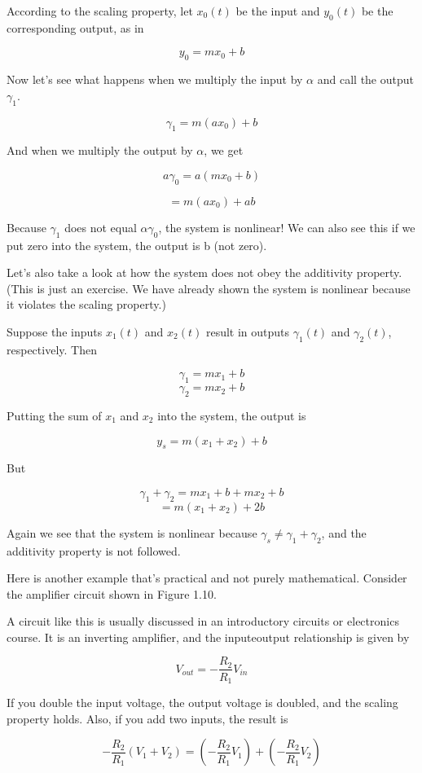 \documentclass[12pt]{article}
\begin{document}
According to the scaling property, let $x_0(t)$ be the input and $y_0(t)$ be the
corresponding output, as in

\[
y_0 = m x_0 + b
\]

Now let’s see what happens when we multiply the input by $\alpha$ and call
the output $\gamma_1$.

\[
\gamma_1 = m (a x_0) + b
\]

And when we multiply the output by $\alpha$, we get

\[
a \gamma_0 = a (m x_0 + b)
\]

\[
=m (a x_0) + ab
\]

Because $\gamma_1$ does not equal $\alpha \gamma_0$, the system is nonlinear! We can also see
this if we put zero into the system, the output is b (not zero).

Let’s also take a look at how the system does not obey the additivity
property. (This is just an exercise. We have already shown the system is
nonlinear because it violates the scaling property.)

Suppose the inputs $x_1(t)$ and $x_2(t)$ result in outputs $\gamma_1(t)$ and $\gamma_2(t)$,
respectively. Then

\[
\gamma_1 = mx_1 + b 
\]
\[
\gamma_2 = mx_2 + b 
\]

Putting the sum of $x_1$ and $x_2$ into the system, the output is

\[
y_s = m(x_1 + x_2) + b 
\]

But

\[
\gamma_1 + \gamma_2 = mx_1 + b + mx_2 + b
\]
\[
= m(x_1 + x_2) + 2b
\]

Again we see that the system is nonlinear because $\gamma_s \neq \gamma_1 + \gamma_2$, and the
additivity property is not followed.

Here is another example that’s practical and not purely mathematical.
Consider the amplifier circuit shown in Figure 1.10.

A circuit like this is usually discussed in an introductory circuits or
electronics course. It is an inverting amplifier, and the inputeoutput
relationship is given by

\[
V_{out} = - \frac{R_2}{R_1} V_{in}
\]


If you double the input voltage, the output voltage is doubled, and the
scaling property holds. Also, if you add two inputs, the result is

\[
-\frac{R_2}{R_1} (V_1 + V_2) = \left ( - \frac{R_2}{R_1} V_1  \right ) + \left ( - \frac{R_2}{R_1} V_2  \right ) 
\]
\end{document}
